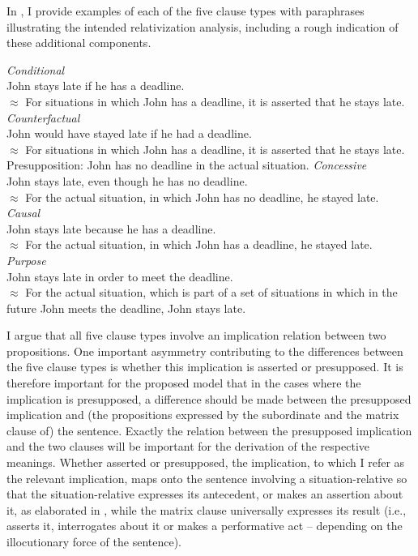 \documentclass[output=paper]{langscibook}
\begin{document}
In , I provide examples of each of the five clause types with paraphrases illustrating the intended relativization analysis, including a rough indication of these additional components.


\ea\label{ex:Sit-Rel-Cl}
\ea \textit{Conditional}\\John stays late if he has a deadline.\\
	$\approx$ For situations in which John has a deadline, it is asserted that he stays late.\label{ex:Sit-Rel-Cl-a}
\ex \textit{Counterfactual}\\John would have stayed late if he had a deadline.\\
    $\approx$ For situations in which John has a deadline, it is asserted that he stays late.\\
    Presupposition: John has no deadline in the actual situation.\label{ex:Sit-Rel-Cl-b}
\ex \textit{Concessive}\\John stays late, even though he has no deadline.\\
	$\approx$ For the actual situation, in which John has no deadline, he stayed late.\label{ex:Sit-Rel-Cl-c}
\ex \textit{Causal}\\John stays late because he has a deadline.\\
	$\approx$ For the actual situation, in which John has a deadline, he stayed late.\label{ex:Sit-Rel-Cl-d}
\ex \textit{Purpose}\\John stays late in order to meet the deadline.\\
	$\approx$ For the actual situation, which is part of a set of situations in which in the future John meets the deadline, John stays late.\label{ex:Sit-Rel-Cl-e}
\z\z

\noindent I argue that all five clause types involve an implication relation between two propositions. One important asymmetry contributing to the differences between the five clause types is whether this implication is asserted or presupposed. It is therefore important for the proposed model that in the cases where the implication is presupposed, a difference should be made between the presupposed implication and (the propositions expressed by the subordinate and the matrix clause of) the sentence. Exactly the relation between the presupposed implication and the two clauses will be important for the derivation of the respective meanings. Whether asserted or presupposed, the implication, to which I refer as the relevant implication, maps onto the sentence involving a situation-relative so that the situation-relative expresses its antecedent, or makes an assertion about it, as elaborated in , while the matrix clause universally expresses its result (i.e., asserts it, interrogates about it or makes a performative act -- depending on the illocutionary force of the sentence).
\end{document}
